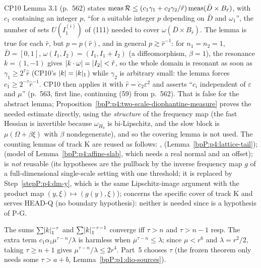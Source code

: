 \begin{remark}\label{bpP:p4:lemma-3-1}
CP10 Lemma 3.1 (p.~562) states $\operatorname{meas}\mathcal R\le(c_1\gamma_1+c_2\gamma_2/\hat r)\operatorname{meas}(\bar D\times B_{\hat r})$, with $c_1$ containing an integer $p$, ``for a suitable integer $p$ depending on $\bar D$ and $\omega_1$'', the number of sets $U(I_1^{(i)})$ of (111) needed to cover $\omega(\bar D\times B_{\hat r})$. The lemma is true for each $\hat r$, but $p=p(\hat r)$, and in general $p\gtrsim\hat r^{-1}$: for $n_1=n_2=1$, $\bar D=[0,1]$, $\omega(I_1,I_2)=(I_1,I_1+I_2)$ (a diffeomorphism, $\beta=1$), the resonance $k=(1,-1)$ gives $\lvert k\cdot\omega\rvert=\lvert I_2\rvert<\hat r$, so the whole domain is resonant as soon as $\gamma_1\ge2^\tau\hat r$ (CP10's $\lvert k\rvert=\lvert k\rvert_1$) while $\gamma_2$ is arbitrary small: the lemma forces $c_1\ge2^{-\tau}\hat r^{-1}$. CP10 then applies it with $\hat r=\check c_2\varepsilon^2$ and asserts ``$c_i$ independent of $\varepsilon$ and $\mu$'' (p.~563, first line, continuing (59) from p.~562). That is false for the abstract lemma; Proposition~\ref{bpP:p4:two-scale-diophantine-measure} proves the needed estimate directly, using the \emph{structure} of the frequency map (the fast Hessian is invertible because $\omega_{H_0}$ is bi-Lipschitz, and the slow block is $\mu(\Omega+\beta\xi)$ with $\beta$ nondegenerate), and so the covering lemma is not used. The counting lemmas of track K are reused as follows: ,  (Lemma~\ref{bpP:p4:lattice-tail});  (model of Lemma~\ref{bpP:p4:affine-slab}, which needs a real normal and an offset);  is \emph{not} reusable (its hypotheses are the pullback by the inverse frequency map $g$ of a full-dimensional single-scale setting with one threshold; it is replaced by Step~\ref{stepP:p4:dm-y}, which is the same Lipschitz-image argument with the product map $(y,\xi)\mapsto(g(y),\xi)$);  concerns the specific cover  of track K and  serves HEAD-Q (no boundary hypothesis): neither is needed since  is a hypothesis of P-G.
\end{remark}

\begin{remark}\label{bpP:p4:tau}
The sums $\sum\lvert k\rvert_1^{-\tau}$ and $\sum\lvert k\rvert_1^{-\tau-1}$ converge iff $\tau>n$ and $\tau>n-1$ resp. The extra term $c_1\alpha_1\mu^{\tau-n}/\lambda$ is harmless when $\mu^{\tau-n}\le\lambda$; since $\mu<r^6$ and $\lambda=r^2/2$, taking $\tau\ge n+1$ gives $\mu^{\tau-n}/\lambda\le2r^4$. Part~5 chooses $\tau$ (the frozen theorem only needs some $\tau>a+b$, Lemma~\ref{bpP:p1:dio-sources}).
\end{remark}

